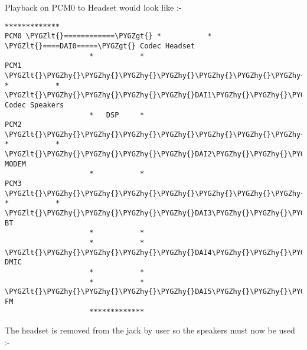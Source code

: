 \documentclass[a4paper,8pt,english]{sphinxmanual}
\def\PYGZlt{\char`\<}
\def\PYGZgt{\char`\>}
\def\PYGZhy{\char`\-}
\begin{document}
Playback on PCM0 to Headset would look like :-

\begin{Verbatim}[commandchars=\\\{\}]
                    *************
PCM0 \PYGZlt{}============\PYGZgt{} *           * \PYGZlt{}====DAI0=====\PYGZgt{} Codec Headset
                    *           *
PCM1 \PYGZlt{}\PYGZhy{}\PYGZhy{}\PYGZhy{}\PYGZhy{}\PYGZhy{}\PYGZhy{}\PYGZhy{}\PYGZhy{}\PYGZhy{}\PYGZhy{}\PYGZhy{}\PYGZhy{}\PYGZgt{} *           * \PYGZlt{}\PYGZhy{}\PYGZhy{}\PYGZhy{}\PYGZhy{}DAI1\PYGZhy{}\PYGZhy{}\PYGZhy{}\PYGZhy{}\PYGZhy{}\PYGZgt{} Codec Speakers
                    *   DSP     *
PCM2 \PYGZlt{}\PYGZhy{}\PYGZhy{}\PYGZhy{}\PYGZhy{}\PYGZhy{}\PYGZhy{}\PYGZhy{}\PYGZhy{}\PYGZhy{}\PYGZhy{}\PYGZhy{}\PYGZhy{}\PYGZgt{} *           * \PYGZlt{}\PYGZhy{}\PYGZhy{}\PYGZhy{}\PYGZhy{}DAI2\PYGZhy{}\PYGZhy{}\PYGZhy{}\PYGZhy{}\PYGZhy{}\PYGZgt{} MODEM
                    *           *
PCM3 \PYGZlt{}\PYGZhy{}\PYGZhy{}\PYGZhy{}\PYGZhy{}\PYGZhy{}\PYGZhy{}\PYGZhy{}\PYGZhy{}\PYGZhy{}\PYGZhy{}\PYGZhy{}\PYGZhy{}\PYGZgt{} *           * \PYGZlt{}\PYGZhy{}\PYGZhy{}\PYGZhy{}\PYGZhy{}DAI3\PYGZhy{}\PYGZhy{}\PYGZhy{}\PYGZhy{}\PYGZhy{}\PYGZgt{} BT
                    *           *
                    *           * \PYGZlt{}\PYGZhy{}\PYGZhy{}\PYGZhy{}\PYGZhy{}DAI4\PYGZhy{}\PYGZhy{}\PYGZhy{}\PYGZhy{}\PYGZhy{}\PYGZgt{} DMIC
                    *           *
                    *           * \PYGZlt{}\PYGZhy{}\PYGZhy{}\PYGZhy{}\PYGZhy{}DAI5\PYGZhy{}\PYGZhy{}\PYGZhy{}\PYGZhy{}\PYGZhy{}\PYGZgt{} FM
                    *************
\end{Verbatim}

The headset is removed from the jack by user so the speakers must now be used :-
\end{document}
